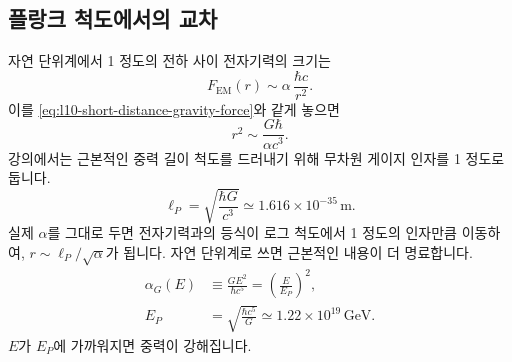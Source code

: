 \begin{classroomqa}
\end{classroomqa}

\begin{classroomqa}
\end{classroomqa}

\begin{classroomqa}
\end{classroomqa}

\subsection{플랑크 척도에서의 교차}

자연 단위계에서 1 정도의 전하 사이 전자기력의 크기는
\begin{equation}
  F_{\mathrm{EM}}(r)
  \sim
  \alpha\,\frac{\hbar c}{r^2}.
  \label{eq:l10-em-force-alpha}
\end{equation}
이를 \eqref{eq:l10-short-distance-gravity-force}와 같게 놓으면
\begin{equation}
  r^2\sim\frac{G\hbar}{\alpha c^3}.
  \label{eq:l10-gravity-em-crossing}
\end{equation}
강의에서는 근본적인 중력 길이 척도를 드러내기 위해 무차원 게이지 인자를 1 정도로 둡니다.
\begin{equation}
  \boxed{\ell_P=\sqrt{\frac{\hbar G}{c^3}}}
  \simeq1.616\times10^{-35}\,\mathrm{m}.
  \label{eq:l10-planck-length}
\end{equation}
실제 \(\alpha\)를 그대로 두면 전자기력과의 등식이 로그 척도에서 1 정도의 인자만큼 이동하여, \(r\sim\ell_P/\sqrt\alpha\)가 됩니다. 자연 단위계로 쓰면 근본적인 내용이 더 명료합니다.
\begin{equation}
\begin{aligned}
  \alpha_G(E)
  &\equiv\frac{GE^2}{\hbar c^5}
  =\left(\frac{E}{E_P}\right)^2,
  \\
  E_P
  &=\sqrt{\frac{\hbar c^5}{G}}
  \simeq1.22\times10^{19}\,\mathrm{GeV}.
\end{aligned}
  \label{eq:l10-gravitational-coupling}
\end{equation}
\(E\)가 \(E_P\)에 가까워지면 중력이 강해집니다.

